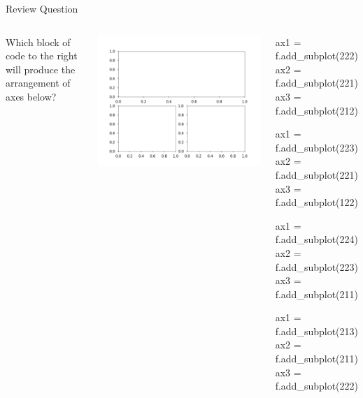 \documentclass[pdf, aspectratio=169, 12pt]{beamer}
\begin{document}
\begin{frame}[fragile]{Review Question}
	\begin{columns}

		\vspace{3mm}
		Which block of code to the right will produce the arrangement of axes below?
		\begin{center}
			\includegraphics[width=\textwidth]{RQ13.png}
		\end{center}
		\vspace{-5mm}
		\begin{poll}
		\item
			\begin{pythoncode}
				ax1 = f.add_subplot(222)
				ax2 = f.add_subplot(221)
				ax3 = f.add_subplot(212)
			\end{pythoncode}

		\item
			\begin{pythoncode}
				ax1 = f.add_subplot(223)
				ax2 = f.add_subplot(221)
				ax3 = f.add_subplot(122)
			\end{pythoncode}

		\item
			\begin{pythoncode}
				ax1 = f.add_subplot(224)
				ax2 = f.add_subplot(223)
				ax3 = f.add_subplot(211)
			\end{pythoncode}

		\item
			\begin{pythoncode}
				ax1 = f.add_subplot(213)
				ax2 = f.add_subplot(211)
				ax3 = f.add_subplot(222)
			\end{pythoncode}
		\end{poll}
	\end{columns}
\end{frame}
\end{document}

